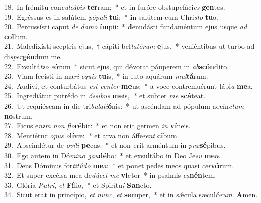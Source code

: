{18.~}In frémitu con\textit{cul}\textit{cá}\textit{bis} \textbf{ter}ram:~* et in furóre obstupefáci\textit{es} \textbf{gen}tes.\\
{19.~}Egréssus es in salútem \textit{pó}\textit{pu}\textit{li} \textbf{tu}i:~* in salútem cum Chri\textit{sto} \textbf{tu}o.\\
{20.~}Percussísti caput \textit{de} \textit{do}\textit{mo} \textbf{ím}pii:~* denudásti fundaméntum ejus usque \textit{ad} \textbf{col}lum.\\
{21.~}Maledixísti sceptris ejus,~† cápiti bel\textit{la}\textit{tó}\textit{rum} \textbf{e}jus,~* veniéntibus ut turbo ad di\textit{sper}\textbf{gén}dum me.\\
{22.~}Exsultá\textit{ti}\textit{o} \textit{e}\textbf{ó}rum~* sicut ejus, qui dévorat páuperem in \textit{ab}\textbf{scón}dito.\\
{23.~}Viam fecísti in ma\textit{ri} \textit{e}\textit{quis} \textbf{tu}is,~* in luto aquárum \textit{mul}\textbf{tá}rum.\\
{24.~}Audívi, et conturbátus \textit{est} \textit{ven}\textit{ter} \textbf{me}us:~* a voce contremuérunt lábi\textit{a} \textbf{me}a.\\
{25.~}Ingrediátur putrédo in \textit{ós}\textit{si}\textit{bus} \textbf{me}is,~* et subter \textit{me} \textbf{scá}teat.\\
{26.~}Ut requiéscam in die tri\textit{bu}\textit{la}\textit{ti}\textbf{ó}nis:~* ut ascéndam ad pópulum accín\textit{ctum} \textbf{no}strum.\\
{27.~}Ficus e\textit{nim} \textit{non} \textit{flo}\textbf{ré}bit:~* et non erit germen \textit{in} \textbf{ví}neis.\\
{28.~}Mentiétur \textit{o}\textit{pus} \textit{o}\textbf{lí}væ:~* et arva non áffe\textit{rent} \textbf{ci}bum.\\
{29.~}Abscindétur de \textit{o}\textit{ví}\textit{li} \textbf{pe}cus:~* et non erit arméntum in \textit{præ}\textbf{sé}pibus.\\
{30.~}Ego autem in Dó\textit{mi}\textit{no} \textit{gau}\textbf{dé}bo:~* et exsultábo in Deo Je\textit{su} \textbf{me}o.\\
{31.~}Deus Dóminus for\textit{ti}\textit{tú}\textit{do} \textbf{me}a:~* et ponet pedes meos quasi \textit{cer}\textbf{vó}rum.\\
{32.~}Et super excélsa mea de\textit{dú}\textit{cet} \textit{me} \textbf{vi}ctor~* in psalmis \textit{ca}\textbf{nén}tem.\\
{33.~}Glória \textit{Pa}\textit{tri}, \textit{et} \textbf{Fí}lio,~* et Spirítu\textit{i} \textbf{San}cto.\\
{34.~}Sicut erat in princípio, \textit{et} \textit{nunc}, \textit{et} \textbf{sem}per,~* et in sǽcula sæculó\textit{rum}. \textbf{A}men.\\
